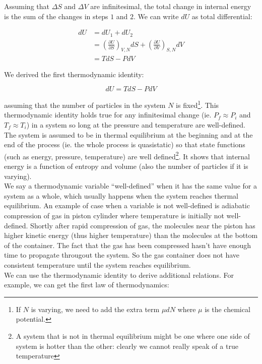 Assuming that $\Delta S$ and $\Delta V$ are infinitesimal, the total change in internal energy is the sum of the changes in steps $1$ and $2$. We can write $dU$ as total differential:

\begin{align*}
	dU&=dU_1+dU_2 \\
	&=\left( \frac{\partial U}{\partial S} \right)_{V,N} dS+\left( \frac{\partial U}{\partial V} \right)_{S,N} dV \\
	&=TdS-PdV
\end{align*}

We derived the first thermodynamic identity:

\[\boxed{dU=TdS-PdV}\]

assuming that the number of particles in the system $N$ is fixed\footnote{If $N$ is varying, we need to add the extra term $\mu dN$ where $\mu$ is the chemical potential.}. This thermodynamic identity holds true for any infinitesimal change (ie. $P_f\approx P_i$ and $T_f\approx T_i$) in a system so long at the pressure and temperature are well-defined. The system is assumed to be in thermal equilibrium at the beginning and at the end of the process (ie. the whole process is quasistatic) so that state functions (such as energy, pressure, temperature) are well defined\footnote{A system that is not in thermal equilibrium might be one where one side of system is hotter than the other: clearly we cannot really speak of a true temperature}. It shows that internal energy is a function of entropy and volume (also the number of particles if it is varying). \\

We say a thermodynamic variable ``well-defined'' when it has the same value for a system as a whole, which usually happens when the system reaches thermal equilibrium. An example of case when a variable is not well-defined is adiabatic compression of gas in piston cylinder where temperature is initially not well-defined. Shortly after rapid compression of gas, the molecules near the piston has higher kinetic energy (thus higher temperature) than the molecules at the bottom of the container. The fact that the gas has been compressed hasn't have enough time to propagate througout the system. So the gas container does not have consistent temperature until the system reaches equilibrium. \\

We can use the thermodynamic identity to derive additional relations. For example, we can get the first law of thermodynamics:

